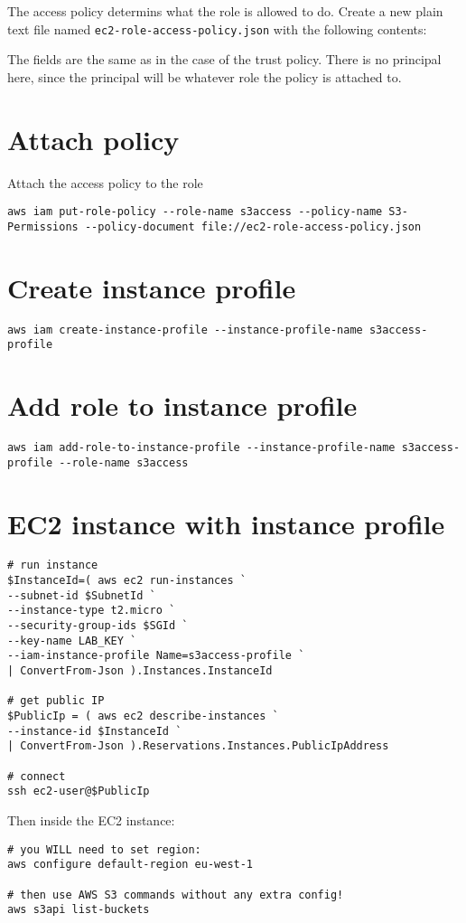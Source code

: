 The access policy determins what the role is allowed to do. Create a new
plain text file named \texttt{ec2-role-access-policy.json} with the
following contents:

The fields are the same as in the case of the trust policy. There is no
principal here, since the principal will be whatever role the policy is
attached to.

\section{Attach policy}\label{attach-policy}

Attach the access policy to the role

\begin{verbatim}
aws iam put-role-policy --role-name s3access --policy-name S3-Permissions --policy-document file://ec2-role-access-policy.json
\end{verbatim}

\section{Create instance profile}\label{create-instance-profile}

\begin{verbatim}
aws iam create-instance-profile --instance-profile-name s3access-profile
\end{verbatim}

\section{Add role to instance
profile}\label{add-role-to-instance-profile}

\begin{verbatim}
aws iam add-role-to-instance-profile --instance-profile-name s3access-profile --role-name s3access
\end{verbatim}

\section{EC2 instance with instance
profile}\label{ec2-instance-with-instance-profile}

\begin{verbatim}
# run instance 
$InstanceId=( aws ec2 run-instances `
--subnet-id $SubnetId `
--instance-type t2.micro `
--security-group-ids $SGId `
--key-name LAB_KEY `
--iam-instance-profile Name=s3access-profile `
| ConvertFrom-Json ).Instances.InstanceId

# get public IP
$PublicIp = ( aws ec2 describe-instances `
--instance-id $InstanceId `
| ConvertFrom-Json ).Reservations.Instances.PublicIpAddress

# connect
ssh ec2-user@$PublicIp
\end{verbatim}

Then inside the EC2 instance:

\begin{verbatim}
# you WILL need to set region:
aws configure default-region eu-west-1

# then use AWS S3 commands without any extra config!
aws s3api list-buckets
\end{verbatim}

